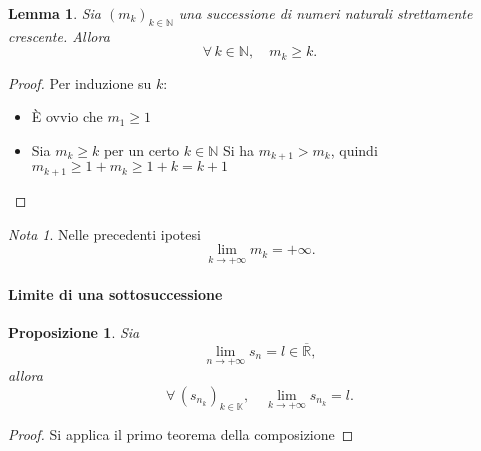 \documentclass{article}
\theoremstyle{plain}
\newtheorem{lem}[thm]{Lemma}
\newtheorem{prop}[thm]{Proposizione}
\theoremstyle{definition}
\theoremstyle{remark}
\newtheorem{note}{Nota}
\begin{document}
\vspace{10pt}

\begin{bxthm}
\begin{lem}
    Sia $(m_k)_{k\in \mathbb{N}}$ una successione di numeri naturali strettamente crescente.
    Allora \[\forall\,k\in\mathbb{N},\quad m_k\geq k.\]
\end{lem}
\end{bxthm}
\begin{proof}
    Per induzione su $k$:
    \begin{itemize}
        \item È ovvio che $m_1\geq 1$
        \item Sia $m_k\geq k$ per un certo $k\in\mathbb{N}$
        Si ha $m_{k+1}>m_k$, quindi $m_{k+1}\geq 1+m_k\geq 1+k=k+1$
    \end{itemize}
\end{proof}

\vspace{10pt}

\begin{note}
    Nelle precedenti ipotesi \[\lim_{k\to+\infty}m_k=+\infty.\]
\end{note}

\vspace{10pt}

\paragraph{Limite di una sottosuccessione}
\begin{bxthm}
\begin{prop}
    Sia \[\lim_{n\to+\infty}s_n=l\in\overline{\mathbb{R}},\]
    allora 
    \[\forall\,(s_{n_k})_{k\in \mathbb{K}},\quad\lim_{k\to+\infty}s_{n_k}=l.\]
\end{prop}
\end{bxthm}
\begin{proof}
    Si applica il primo teorema della composizione
\end{proof}

\vspace{10pt}
\end{document}
